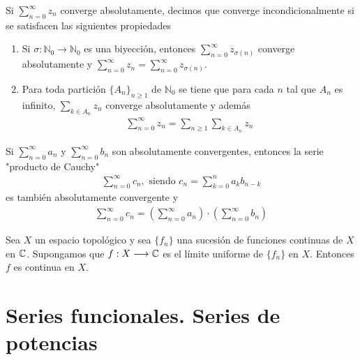 \begin{defi}
    Si $\sum_{n=0}^{\infty}{z_n}$ converge absolutamente, decimos que converge incondicionalmente si se satisfacen las siguientes propiedades
    \begin{enumerate}
        \item Si $\sigma : \mathbb{N}_0 \longrightarrow \mathbb{N}_0$ es una biyección, entonces $\sum_{n=0}^{\infty}{z_{\sigma(n)}}$ converge absolutamente y $\sum_{n=0}^{\infty}{z_n} = \sum_{n=0}^{\infty}{z_{\sigma(n)}}$.
        \item Para toda partición $\{A_n\}_{n \ge 1}$ de $\mathbb{N}_0$ se tiene que para cada $n$ tal que $A_n$ es infinito, $\sum_{k\in A_n}{z_n}$ converge absolutamente y además
              \begin{align*}
                  \sum_{n=0}^{\infty}{z_n} = \sum_{n \ge 1}\sum_{k\in A_n}{z_n}
              \end{align*}
    \end{enumerate}
\end{defi}

\begin{prop}
    Si $\sum_{n=0}^{\infty}{a_n}$ y $\sum_{n=0}^{\infty}{b_n}$ son absolutamente convergentes, entonces la serie "producto de Cauchy"
    \begin{align*}
        \sum_{n=0}^{\infty}{c_n}, \text{ siendo } c_n = \sum_{k=0}^{n}{a_kb_{n-k}}
    \end{align*}
    es también absolutamente convergente y
    \begin{align*}
        \sum_{n=0}^{\infty}{c_n} = \left( \sum_{n=0}^{\infty}{a_n}\right) \cdot \left( \sum_{n=0}^{\infty}{b_n}\right)
    \end{align*}
\end{prop}

\begin{prop}
    Sea $X$ un espacio topológico y sea $\{f_n\}$ una sucesión de funciones continuas de $X$ en $\mathbb{C}$. Supongamos que $f: X \longrightarrow \mathbb{C}$ es el límite uniforme de $\{f_n\}$ en $X$. Entonces $f$ es continua en $X$.
\end{prop}

\section{Series funcionales. Series de potencias}

